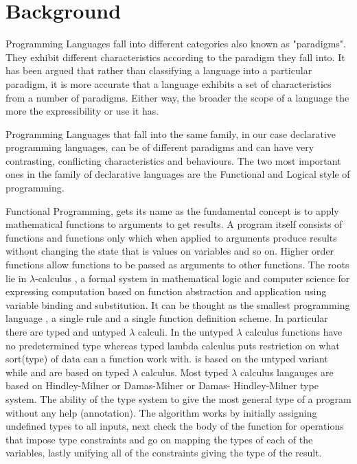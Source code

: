 \documentclass[thesis-solanki.tex]{subfiles}
\begin{document}
\chapter{Background}\label{chap:background}

Programming Languages fall into different categories also known as "paradigms". They exhibit different 
characteristics according to the paradigm they fall into. It has been argued 
\cite{Krishnamurthi:2008:TPL:1480828.1480846} that rather than classifying a language into a particular paradigm, it 
is more accurate that a language exhibits a set of characteristics from a number of paradigms. Either way, the 
broader the scope of a language the more the expressibility or use it has.  

\par Programming Languages that fall into the same family, in our case declarative programming languages, can 
be of different paradigms and can have very contrasting, conflicting characteristics and behaviours. The two most 
important ones in the family of declarative languages are the Functional and Logical style of programming.

\par Functional Programming, \cite{hughes1989functional} gets its name as the fundamental concept is to apply 
mathematical functions to arguments to get results. A program itself consists of functions and functions only which 
when applied to arguments produce results without changing the state that is values on variables and so on. Higher 
order functions allow functions to be passed as arguments to other functions. The roots lie in $\lambda$-calculus 
\cite{website:lambdacalculuswiki}, a formal system in mathematical logic and computer science for expressing 
computation based on function abstraction and application using variable binding and substitution.  It can be 
thought as the smallest programming language \cite{rojas2004tutorial}, a single rule and a single function 
definition scheme. In particular there are typed and untyped $\lambda$ calculi. In the untyped $\lambda$ calculus 
functions have no predetermined type whereas typed lambda calculus puts restriction on what sort(type) of data 
can a function work with.  is based on the untyped variant while  and 
 are based on typed $\lambda$ calculus. Most typed $\lambda$ calculus langauges are based 
on Hindley-Milner or Damas-Milner or Damas- Hindley-Milner \cite{website:hdmtypesystemwiki} type system. 
The ability of the type system to give the most general type of a program without any help (annotation).  The 
algorithm \cite{website:hdmtypesystem} works by initially assigning undefined types to all inputs, next check the 
body of the function for operations that impose type constraints and go on mapping the types of each of the 
variables, lastly unifying all of the constraints giving the type of the result. 
\end{document}
